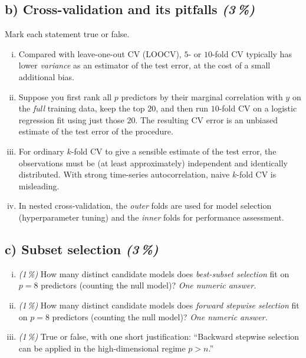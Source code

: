 \documentclass[11pt,a4paper]{article}
\newcommand{\subpoints}[1]{\textit{(#1\,\%)}}
\begin{document}
\subsection*{b) Cross-validation and its pitfalls \subpoints{3}}
Mark each statement true or false.
\begin{enumerate}[(i)]
  \item Compared with leave-one-out CV (LOOCV), $5$- or $10$-fold CV typically has lower \emph{variance} as an estimator of the test error, at the cost of a small additional bias.
  \item Suppose you first rank all $p$ predictors by their marginal correlation with $y$ on the \emph{full} training data, keep the top $20$, and then run $10$-fold CV on a logistic regression fit using just those $20$. The resulting CV error is an unbiased estimate of the test error of the procedure.
  \item For ordinary $k$-fold CV to give a sensible estimate of the test error, the observations must be (at least approximately) independent and identically distributed. With strong time-series autocorrelation, naive $k$-fold CV is misleading.
  \item In nested cross-validation, the \emph{outer} folds are used for model selection (hyperparameter tuning) and the \emph{inner} folds for performance assessment.
\end{enumerate}

\subsection*{c) Subset selection \subpoints{3}}
\begin{enumerate}[(i)]
  \item \subpoints{1} How many distinct candidate models does \emph{best-subset selection} fit on $p = 8$ predictors (counting the null model)? \emph{One numeric answer.}
  \item \subpoints{1} How many distinct candidate models does \emph{forward stepwise selection} fit on $p = 8$ predictors (counting the null model)? \emph{One numeric answer.}
  \item \subpoints{1} True or false, with one short justification: ``Backward stepwise selection can be applied in the high-dimensional regime $p > n$.''
\end{enumerate}
\end{document}

